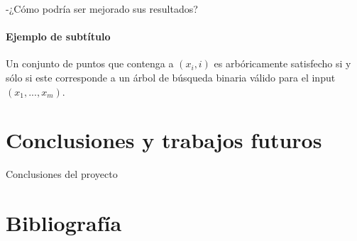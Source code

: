 \documentclass[twocolumn]{article}
\begin{document}
-¿Cómo podría ser mejorado sus resultados?






\paragraph{Ejemplo de subtítulo}
Un conjunto de puntos que contenga a $ (x_i,i) $ es arb\'oricamente
satisfecho si y s\'olo si este corresponde a un \'arbol de b\'usqueda
binaria v\'alido para el input $ (x_1,...,x_m) $.

\section{Conclusiones y trabajos futuros}
Conclusiones del proyecto
\section{Bibliografía}

%
\nocite{*}



\end{document}
